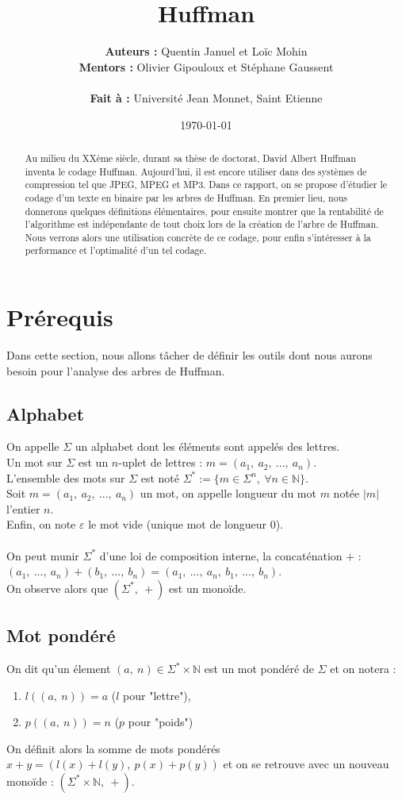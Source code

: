 \documentclass[a4paper, 12pt]{article}
\title{Huffman}
\author{
\textbf{Auteurs :} Quentin Januel et Loïc Mohin \\
\textbf{Mentors :} Olivier Gipouloux et Stéphane Gaussent \\ \\
\textbf{Fait à :} Université Jean Monnet, Saint Etienne
}
\date{\today}
\begin{document}
\maketitle
\begin{abstract}
Au milieu du XXème siècle, durant sa thèse de doctorat, David Albert Huffman inventa le codage Huffman. Aujourd'hui, il est encore utiliser dans des systèmes de compression tel que JPEG, MPEG et MP3.
Dans ce rapport, on se propose d'étudier le codage d'un texte en binaire par les arbres de Huffman. En premier lieu, nous donnerons quelques définitions élémentaires, pour ensuite montrer que la rentabilité de l'algorithme est indépendante de tout choix lors de la création de l'arbre de Huffman. Nous verrons alors une utilisation concrète de ce codage, pour enfin s'intéresser à la performance et l'optimalité d'un tel codage.
\end{abstract}
\newpage
\tableofcontents{}
\newpage

\section{Prérequis}

Dans cette section, nous allons tâcher de définir les outils dont nous aurons besoin pour l'analyse des arbres de Huffman.

\subsection{Alphabet}
On appelle $\Sigma$ un alphabet dont les éléments sont appelés des lettres. \\
Un mot sur $\Sigma$ est un $n$-uplet de lettres : $m = (a_1,\ a_2,\ ...,\ a_n)$. \\
L'ensemble des mots sur $\Sigma$ est noté $\Sigma^* := \{m \in \Sigma^n,\ \forall n \in \mathbb{N}\}$. \\
Soit $m = (a_1,\ a_2,\ ...,\ a_n)$ un mot, on appelle longueur du mot $m$ notée $|m|$ l'entier $n$. \\
Enfin, on note $\varepsilon$ le mot vide (unique mot de longueur $0$). \\ \\
On peut munir $\Sigma^*$ d'une loi de composition interne, la concaténation $+$ : \\
$(a_1,\ ...,\ a_n)+(b_1,\ ...,\ b_n) = (a_1,\ ...,\ a_n,\ b_1,\ ...,\ b_n)$. \\
On observe alors que $(\Sigma^*,\ +)$ est un monoïde.

\subsection{Mot pondéré}
On dit qu'un élement $(a,\ n)\in \Sigma^*\times \mathbb{N}$ est un mot pondéré de $\Sigma$ et on notera :
\begin{enumerate}
\item $l((a,\ n)) = a$ ($l$ pour "lettre"),
\item $p((a,\ n)) = n$ ($p$ pour "poids")
\end{enumerate}
On définit alors la somme de mots pondérés $x+y = (l(x)+l(y),\ p(x)+p(y))$ et on se retrouve avec un nouveau monoïde :  $(\Sigma^*\times \mathbb{N},\ +)$.
\end{document}
